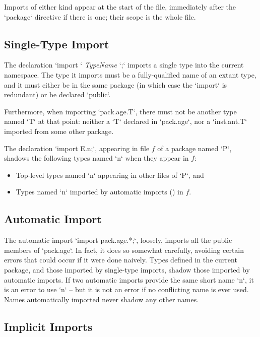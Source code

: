 Imports of either kind appear at the start of the file, immediately after the
\xcd`package` directive if there is one; their scope is the whole file.

\subsection{Single-Type Import}

The declaration \xcd`import ` {\em TypeName} \xcd`;` imports a single type
into the current namespace.  The type it imports must be a fully-qualified
name of an extant type, and it must either be in the same package (in which
case the \xcd`import` is redundant) or be declared \xcd`public`.  

Furthermore, when importing \xcd`pack.age.T`, there must not be another type
named \xcd`T` at that point: neither a  \xcd`T` declared in \xcd`pack.age`,
nor a \xcd`inst.ant.T` imported from some other package.

The declaration \xcd`import E.n;`, appearing in file $f$ of a package named
\xcd`P`, shadows the following types named \xcd`n` when they appear in $f$: 
\begin{itemize}
\item Top-level types named \xcd`n` appearing in other files of \xcd`P`, and 
\item Types named \xcd`n` imported by automatic imports
      () in $f$.
\end{itemize}
\noindent


\subsection{Automatic Import}
\label{sect:AutomaticImport}

The automatic import \xcd`import pack.age.*;`, loosely, imports all the public
members of \xcd`pack.age`.  In fact, it does so somewhat carefully, avoiding
certain errors that could occur if it were done naively.  Types defined in the
current package, and those imported by single-type imports, shadow those
imported by automatic imports.   
If two automatic imports provide the same short name \xcd`n`, it is an error
to use \xcd`n` -- but it is not an error if no conflicting name is ever used. 
Names automatically imported never shadow any
other names.



\subsection{Implicit Imports}

